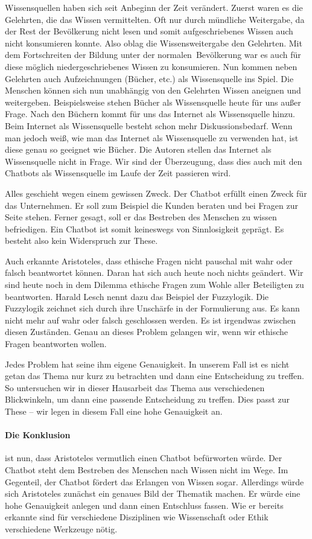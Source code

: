 Wissensquellen haben sich seit Anbeginn der Zeit verändert. Zuerst waren es die Gelehrten, die das Wissen vermittelten. 
Oft nur durch mündliche Weitergabe, da der Rest der Bevölkerung nicht lesen und somit aufgeschriebenes Wissen auch nicht konsumieren konnte. Also oblag die Wissensweitergabe den Gelehrten. Mit dem Fortschreiten der Bildung unter der \glqq normalen\grqq\ Bevölkerung war es auch für diese möglich niedergeschriebenes Wissen zu konsumieren. Nun kommen neben Gelehrten auch Aufzeichnungen (Bücher, etc.) als Wissensquelle ins Spiel. Die Menschen können sich nun unabhängig von den Gelehrten Wissen aneignen und weitergeben. Beispielsweise stehen Bücher als Wissensquelle heute für uns außer Frage. Nach den Büchern kommt für uns das Internet als Wissensquelle hinzu. Beim Internet als Wissensquelle besteht schon mehr Diskussionsbedarf. Wenn man jedoch weiß, wie man das Internet als Wissensquelle zu verwenden hat, ist diese genau so geeignet wie Bücher. Die Autoren stellen das Internet als Wissensquelle nicht in Frage. Wir sind der Überzeugung, dass dies auch mit den Chatbots als Wissensquelle im Laufe der Zeit passieren wird. 

\glqq Alles geschieht wegen einem gewissen Zweck\grqq. Der Chatbot erfüllt einen Zweck für das Unternehmen. Er soll zum Beispiel die Kunden beraten und bei Fragen zur Seite stehen. Ferner gesagt, soll er das Bestreben des Menschen zu wissen befriedigen. Ein Chatbot ist somit keineswegs von Sinnlosigkeit geprägt. Es besteht also kein Widerspruch zur These.

Auch erkannte Aristoteles, dass ethische Fragen nicht pauschal mit wahr oder falsch beantwortet können. Daran hat sich auch heute noch nichts geändert. Wir sind heute noch in dem Dilemma ethische Fragen zum Wohle aller Beteiligten zu beantworten. Harald Lesch nennt dazu das Beispiel der Fuzzylogik. Die Fuzzylogik zeichnet sich durch ihre Unschärfe in der Formulierung aus. Es kann nicht mehr auf wahr oder falsch geschlossen werden. Es ist irgendwas zwischen diesen Zuständen. Genau an dieses Problem gelangen wir, wenn wir ethische Fragen beantworten wollen.

\glqq Jedes Problem hat seine ihm eigene Genauigkeit\grqq. In unserem Fall ist es nicht getan das Thema nur kurz zu betrachten und dann eine Entscheidung zu treffen. So untersuchen wir in dieser Hausarbeit das Thema aus verschiedenen Blickwinkeln, um dann eine passende Entscheidung zu treffen. Dies passt zur These -- wir legen in diesem Fall eine hohe Genauigkeit an.

\paragraph{Die Konklusion} ist nun, dass Aristoteles vermutlich einen Chatbot befürworten würde. Der Chatbot steht dem Bestreben des Menschen nach Wissen nicht im Wege. Im Gegenteil, der Chatbot fördert das Erlangen von Wissen sogar. Allerdings würde sich Aristoteles zunächst ein genaues Bild der Thematik machen. Er würde eine hohe Genauigkeit anlegen und dann einen Entschluss fassen. Wie er bereits erkannte sind für verschiedene Disziplinen wie Wissenschaft oder Ethik verschiedene Werkzeuge nötig.    
